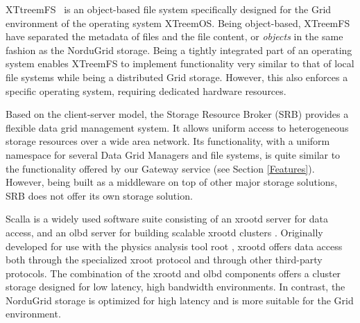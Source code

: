 \documentclass{llncs}
\begin{document}
XTtreemFS~\cite{xtreemfs} is an object-based
file system specifically designed for the Grid environment of the
operating system XTreemOS. Being object-based, XTreemFS have separated
the metadata of files and the file content, or {\it objects} in the
same fashion as the NorduGrid storage. Being
a tightly integrated part of an operating system enables XTreemFS to
implement functionality very similar to that of local file
systems while being a distributed Grid storage. However, this also enforces
a specific operating system, requiring dedicated hardware resources.

Based on the client-server model,
the Storage Resource Broker (SRB) \cite{earlySRB,SRB} provides a flexible data grid management
system. It allows  uniform access to heterogeneous
storage resources over a wide area network. %
Its functionality, with a uniform namespace for several Data Grid
Managers and file systems, is quite similar to the functionality
offered by our Gateway service (see Section \ref{Features}). However, being built as a middleware on top of
other major storage solutions, SRB does not offer its own storage solution.

Scalla is a widely used software suite consisting of an
xrootd server for data access, and an olbd
server for building scalable xrootd clusters \cite{Scalla}. %
Originally developed for use with the physics analysis tool root \cite{root},
xrootd offers data access both through the specialized xroot protocol
and through other third-party protocols. The combination of the xrootd
and olbd components offers a cluster storage designed for low latency,
high bandwidth environments. In contrast, the NorduGrid storage is optimized
for high latency and is more suitable for the Grid environment.
\end{document}

